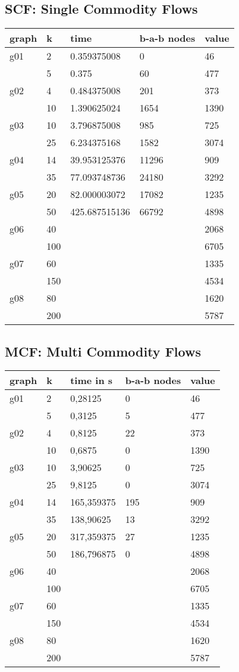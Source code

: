 \subsection{SCF: Single Commodity Flows}
\begin{tabular}{| l l l l l |}
\hline
graph	&	k	&	time		&	b-a-b nodes &	value	\\ \hline \hline
g01	&	2	&	0.359375008		&	0		&	46	\\
	&	5	&	0.375			&	60		&	477	\\ \hline
g02	&	4	&	0.484375008		&	201		&	373	\\
	&	10	&	1.390625024		&	1654	&	1390	\\ \hline
g03	&	10	&	3.796875008		&	985		&	725	\\
	&	25	&	6.234375168		&	1582	&	3074	\\ \hline
g04	&	14	&	39.953125376	&	11296	&	909	\\
	&	35	&	77.093748736	&	24180	&	3292	\\ \hline
g05	&	20	&	82.000003072	&	17082	&	1235	\\
	&	50	&	425.687515136	&	66792	&	4898	\\ \hline
g06	&	40	&			&		&	2068	\\
	&	100	&			&		&	6705	\\ \hline
g07	&	60	&			&		&	1335	\\
	&	150	&			&		&	4534	\\ \hline
g08	&	80	&			&		&	1620	\\
	&	200	&			&		&	5787	\\ \hline
\end{tabular}


\subsection{MCF: Multi Commodity Flows}
\begin{tabular}{| l l l l l |}
\hline
graph	&	k	&	time in s	&	b-a-b nodes &	value	\\ \hline \hline
g01	&	2	&	0,28125 	&	0	&	46	\\
	&	5	&	0,3125 		&	5	&	477	\\ \hline
g02	&	4	&	0,8125 		&	22	&	373	\\
	&	10	&	0,6875 		&	0	&	1390	\\ \hline
g03	&	10	&	3,90625 	&	0	&	725	\\
	&	25	&	9,8125 		&	0	&	3074	\\ \hline
g04	&	14	&	165,359375 	&	195	&	909	\\
	&	35	&	138,90625 	&	13	&	3292	\\ \hline
g05	&	20	&	317,359375 	&	27	&	1235	\\
	&	50	&	186,796875 	&	0	&	4898	\\ \hline
g06	&	40	&			&		&	2068	\\
	&	100	&			&		&	6705	\\ \hline
g07	&	60	&			&		&	1335	\\
	&	150	&			&		&	4534	\\ \hline
g08	&	80	&			&		&	1620	\\
	&	200	&			&		&	5787	\\ \hline
\end{tabular}



